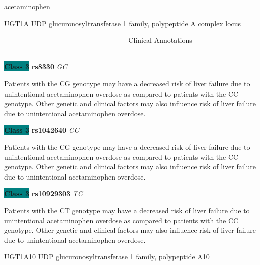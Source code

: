 \documentclass{resume} %
\begin{document}
\begin{rSection}{ acetaminophen }
\begin{rSubsection}{ UGT1A }{ UDP glucuronosyltransferase 1 family, polypeptide A complex locus }{}{}
\item[] ---------------------------------------------------- Clinical Annotations -----------------------------------------------------\newline
\item \textbf{\colorbox{teal} {Class 3}} \textbf{ rs8330 } \textit{ GC }
\item[] Patients with the CG genotype may have a decreased risk of liver failure due to unintentional acetaminophen overdose as compared to patients with the CC genotype. Other genetic and clinical factors may also influence risk of liver failure due to unintentional acetaminophen overdose.\item \textbf{\colorbox{teal} {Class 3}} \textbf{ rs1042640 } \textit{ GC }
\item[] Patients with the CG genotype may have a decreased risk of liver failure due to unintentional acetaminophen overdose as compared to patients with the CC genotype. Other genetic and clinical factors may also influence risk of liver failure due to unintentional acetaminophen overdose.\item \textbf{\colorbox{teal} {Class 3}} \textbf{ rs10929303 } \textit{ TC }
\item[] Patients with the CT genotype may have a decreased risk of liver failure due to unintentional acetaminophen overdose as compared to patients with the CC genotype. Other genetic and clinical factors may also influence risk of liver failure due to unintentional acetaminophen overdose.
\end{rSubsection}\begin{rSubsection}{ UGT1A10 }{ UDP glucuronosyltransferase 1 family, polypeptide A10 }{}{}
\item[]


\end{rSubsection}
\end{rSection}
\end{document}
